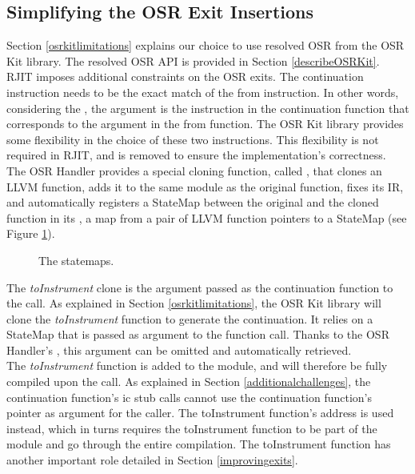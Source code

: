 \subsection{Simplifying the OSR Exit Insertions}

Section \ref{osrkitlimitations} explains our choice to use resolved OSR from the OSR Kit\cite{OSRKit} library.
The resolved OSR API is provided in Section \ref{describeOSRKit}.\\

RJIT imposes additional constraints on the OSR exits. 
The continuation instruction needs to be the exact match of the from instruction.
In other words, considering the , the  argument is the instruction in the continuation function that corresponds to the  argument in the from function.
The OSR Kit library provides some flexibility in the choice of these two instructions. 
This flexibility is not required in RJIT, and is removed to ensure the implementation's correctness.\\

The OSR Handler provides a special cloning function, called , that clones an LLVM function, adds it to the same module as the original function, fixes its IR, and automatically registers a StateMap between the original and the cloned function in its , a map from a pair of LLVM function pointers to a StateMap (see Figure \ref{fig:statemaps}).\\

\begin{figure}[h]
\caption{The statemaps.}
\label{fig:statemaps}
\end{figure}

The \textit{toInstrument} clone is the argument passed as the continuation function to the  call.
As explained in Section \ref{osrkitlimitations}, the OSR Kit library will clone the \textit{toInstrument} function to generate the continuation.
It relies on a StateMap that is passed as argument to the function call. 
Thanks to the OSR Handler's , this argument can be omitted and automatically retrieved.\\

The \textit{toInstrument} function is added to the module, and will therefore be fully compiled upon the  call.
As explained in Section \ref{additionalchallenges}, the continuation function's ic stub calls cannot use the continuation function's pointer as argument for the caller. 
The toInstrument function's address is used instead, which in turns requires the toInstrument function to be part of the module and go through the entire compilation.
The toInstrument function has another important role detailed in Section \ref{improvingexits}.\\

